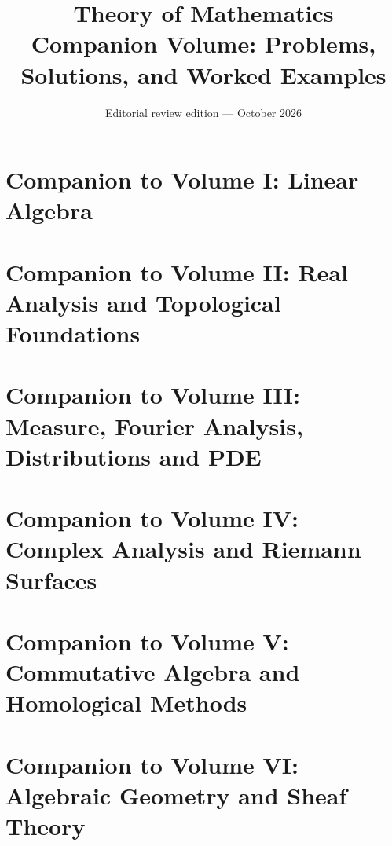 \documentclass[11pt,a4paper,oneside,openany]{book}
\title{Theory of Mathematics\\[0.5em]\Large Companion Volume: Problems, Solutions, and Worked Examples}
\author{}
\date{Editorial review edition --- October 2026}
\begin{document}
\maketitle
\clearpage

\frontmatter
\tableofcontents

\cleardoublepage
{}
{}
\listoffigures
\cleardoublepage




\mainmatter

\part{Companion to Volume I: Linear Algebra}


\part{Companion to Volume II: Real Analysis and Topological Foundations}


\part{Companion to Volume III: Measure, Fourier Analysis, Distributions and PDE}


\part{Companion to Volume IV: Complex Analysis and Riemann Surfaces}


\part{Companion to Volume V: Commutative Algebra and Homological Methods}


\part{Companion to Volume VI: Algebraic Geometry and Sheaf Theory}
\let\CompanionOriginalAddcontentsline\addcontentsline
\renewcommand{\addcontentsline}[3]{%
  \ifstrequal{#1}{toc}{%
    \ifstrequal{#2}{subsection}{}{%
      \ifstrequal{#2}{subsubsection}{}{\CompanionOriginalAddcontentsline{#1}{#2}{#3}}%
    }%
  }{\CompanionOriginalAddcontentsline{#1}{#2}{#3}}%
}

\let\addcontentsline\CompanionOriginalAddcontentsline
\end{document}
